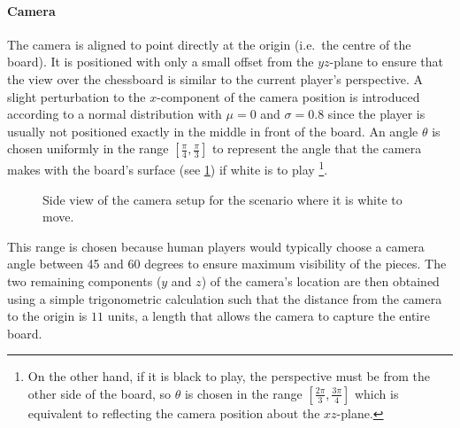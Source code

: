 \documentclass[../report.tex]{subfiles}
\begin{document}
\paragraph{Camera}
The camera is aligned to point directly at the origin (i.e.\ the centre of the board).
It is positioned with only a small offset from the $yz$-plane to ensure that the view over the chessboard is similar to the current player's perspective. 
A slight perturbation to the $x$-component of the camera position is introduced according to a normal distribution with $\mu=0$ and $\sigma=0.8$ since the player is usually not positioned exactly in the middle in front of the board.
An angle $\theta$ is chosen uniformly in the range $\left[\frac{\pi}{4},\frac{\pi}{3}\right]$ to represent the angle that the camera makes with the board's surface (see \cref{fig:camera_angle}) if white is to play%
\footnote{On the other hand, if it is black to play, the perspective must be from the other side of the board, so $\theta$ is chosen in the range $\left[\frac{2\pi}{3},\frac{3\pi}{4}\right]$ which is equivalent to reflecting the camera position about the $xz$-plane.}.
\begin{figure}
    \centering
    \caption{Side view of the camera setup for the scenario where it is white to move. }
    \label{fig:camera_angle}
\end{figure}
This range is chosen because human players would typically choose a camera angle between 45 and 60 degrees to ensure maximum visibility of the pieces.
The two remaining components ($y$ and $z$) of the camera's location are then obtained using a simple trigonometric calculation such that the distance from the camera to the origin is $11$ units, a length that allows the camera to capture the entire board.
\end{document}
